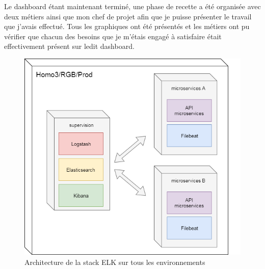 	Le dashboard étant maintenant terminé, une phase de recette a été organisée avec deux métiers ainsi que mon chef de projet afin que je puisse présenter le travail que j'avais effectué. Tous les graphiques ont été présentés et les métiers ont pu vérifier que chacun des besoins que je m'étais engagé à satisfaire était effectivement présent sur ledit dashboard.

\begin{figure}[h!]
	\includegraphics[scale=0.5]{images/travailNeuflizeOBC/dashboard/elkDeploiement.png}
	\centering
	\caption{Architecture de la stack ELK sur tous les environnements}
	\label{elkDeploiement}
\end{figure}